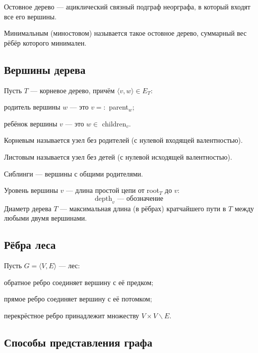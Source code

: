 {\bold Остовное дерево} --- ациклический связный подграф неорграфа, в который входят все его вершины.

{\bold Минимальным} ({\bold миностовом}) называется такое {\ital остовное дерево}, суммарный вес рёбёр которого минимален.

\subsection{Вершины дерева}

Пусть $T$ --- корневое дерево, причём $\langle v,w\rangle\in E_T$:

\begin{list*}
\item{\bold родитель} вершины $w$ --- это $v=:$ parent$_w$;
\item{\bold ребёнок} вершины $v$ --- это $w\in$ children$_v$.
\end{list*}

{\bold Корневым} называется узел без родителей {\ital (с нулевой входящей валентностью)}.

{\bold Листовым} называется узел без детей {\ital (с нулевой исходящей валентностью)}.

{\bold Сиблинги} --- вершины с общими родителями.

{\bold Уровень} вершины $v$ --- длина простой цепи от root$_T$ до $v$:
$$\text{depth}_v\text{ --- обозначение}$$
{\bold Диаметр} дерева $T$ --- максимальная длина {\ital (в рёбрах)} кратчайшего пути в $T$ между любыми двумя вершинами.

\subsection{Рёбра леса}

Пусть $G=\langle V,E\rangle$ --- лес:
\begin{list*}
\item{\bold обратное} ребро соединяет вершину с её {\ital предком};
\item{\bold прямое} ребро соединяет вершину с её {\ital потомком};
\item{\bold перекрёстное} ребро принадлежит множеству $V\times V\backslash E$.
\end{list*}

\subsection{Способы представления графа}

